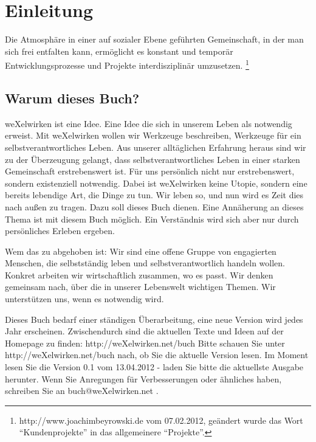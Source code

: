 \chapter{Einleitung}
\glqq
Die Atmosphäre in einer auf sozialer Ebene geführten Gemeinschaft, in der man sich frei entfalten kann, ermöglicht es konstant und temporär Entwicklungsprozesse und Projekte interdisziplinär umzusetzen. 
\grqq \footnote{http://www.joachimbeyrowski.de vom 07.02.2012, geändert wurde das Wort "`Kundenprojekte"' in das allgemeinere "`Projekte"'.}

  \section{Warum dieses Buch?}
    weXelwirken ist eine Idee.
    Eine Idee die sich in unserem Leben als notwendig erweist. 
    Mit weXelwirken wollen wir Werkzeuge beschreiben, Werkzeuge für ein selbstverantwortliches Leben.
    Aus unserer alltäglichen Erfahrung heraus sind wir zu der Überzeugung gelangt, dass selbstverantwortliches Leben in einer starken Gemeinschaft erstrebenswert ist.
    Für uns persönlich nicht nur erstrebenswert, sondern existenziell notwendig.
    Dabei ist weXelwirken keine Utopie, sondern eine bereits lebendige Art, die Dinge zu tun.
    Wir leben so, und nun wird es Zeit dies nach außen zu tragen.
    Dazu soll dieses Buch dienen.
    Eine Annäherung an dieses Thema ist mit diesem Buch möglich.
    Ein Verständnis wird sich aber nur durch persönliches Erleben ergeben.



    Wem das zu abgehoben ist: Wir sind eine offene Gruppe von engagierten Menschen, die selbstständig leben und selbstverantwortlich handeln wollen.
    Konkret arbeiten wir wirtschaftlich zusammen, wo es passt.
    Wir denken gemeinsam nach, über die in unserer Lebenswelt wichtigen Themen.
    Wir unterstützen uns, wenn es notwendig wird.



    Dieses Buch bedarf einer ständigen Überarbeitung, eine neue Version wird jedes Jahr erscheinen.
    Zwischendurch sind die aktuellen Texte und Ideen auf der Homepage zu finden: http://weXelwirken.net/buch
    Bitte schauen Sie unter\\ http://weXelwirken.net/buch nach, ob Sie die aktuelle Version lesen.
    Im Moment lesen Sie die Version 0.1 vom 13.04.2012 - laden Sie bitte die aktuellste Ausgabe herunter.
    Wenn Sie Anregungen für Verbesserungen oder ähnliches haben, schreiben Sie an buch@weXelwirken.net .
